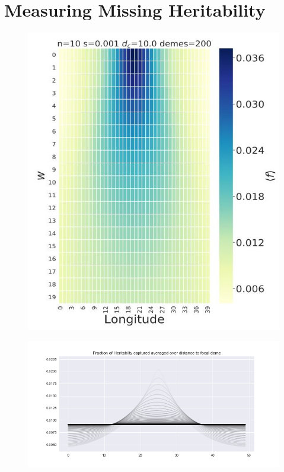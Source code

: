 \section{Measuring Missing Heritability}

\begin{figure}[h]
    \centering
    \includegraphics[scale=0.3]{img/sampling_heatmap.JPG}
    \caption{}
    \label{fig:}
\end{figure}


\begin{figure}[h]
    \centering
    \includegraphics[scale=0.3]{img/H_plot_s_0.0001_m_0.1_pop_size_1e-5.png}
    \caption{}
    \label{fig:}
\end{figure}